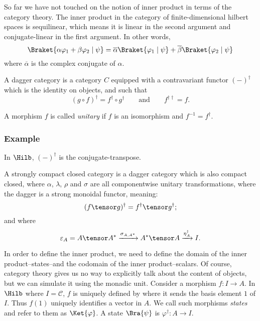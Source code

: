 So far we have not touched on the notion of inner product in terms of the category theory.
The inner product in the category of finite-dimensional hilbert spaces is sequilinear,
which means it is linear in the second argument and conjugate-linear in the first argument.
In other words,
\[ \Braket{\alpha \varphi_1 + \beta \varphi_2 \mid \psi} 
   = \overline{\alpha} \Braket{\varphi_1 \mid \psi} + \overline{\beta} \Braket{\varphi_2 \mid \psi}
\]
where $\overline{\alpha}$ is the complex conjugate of $\alpha$.


\begin{definition}
    A dagger category is a category $C$ equipped with a contravariant functor $(-)^\dagger$ 
    which is the identity on objects, and such that 
    \[ (g \circ f)^\dagger = f^\dagger \circ g^\dagger \qquad\text{and}\qquad f^{\dagger\dagger} = f. \]
\end{definition}

A morphism $f$ is called \emph{unitary} if $f$ is an isomorphism and $f^{-1}=f^\dagger$.

\subsubsection*{Example} In $\Hilb$, $(-)^\dagger$ is the conjugate-transpose.

\begin{definition}
    A strongly compact closed category is a dagger category which is also compact closed,
    where $\alpha$, $\lambda$, $\rho$ and $\sigma$ are all componentwise unitary transformations,
    where the dagger is a strong monoidal functor, meaning:
    \[ (f \tensor g)^\dagger = f^\dagger \tensor g^\dagger; \]
    and where
    \[ \varepsilon_A = A \tensor A^*
        \xrightarrow{\sigma_{A,A^*}} A^* \tensor A
        \xrightarrow{\eta_A^\dagger} I.
    \]
\end{definition}

In order to define the inner product, we need to define the domain of the inner product--states--and
the codomain of the inner product--scalars. Of course, category theory gives us no way to explicitly
talk about the content of objects, but we can simulate it using the monadic unit. Consider a morphism
$f : I \rightarrow A$. In $\Hilb$ where $I=\mathcal{C}$, $f$ is uniquely defined by where it sends
the basis element $1$ of $I$. Thus $f(1)$ uniquely identifies a vector in $A$. We call such morphisms
\emph{states} and refer to them as $\Ket{\varphi}$. A state $\Bra{\psi}$ is $\varphi^\dagger : A \rightarrow I$.

